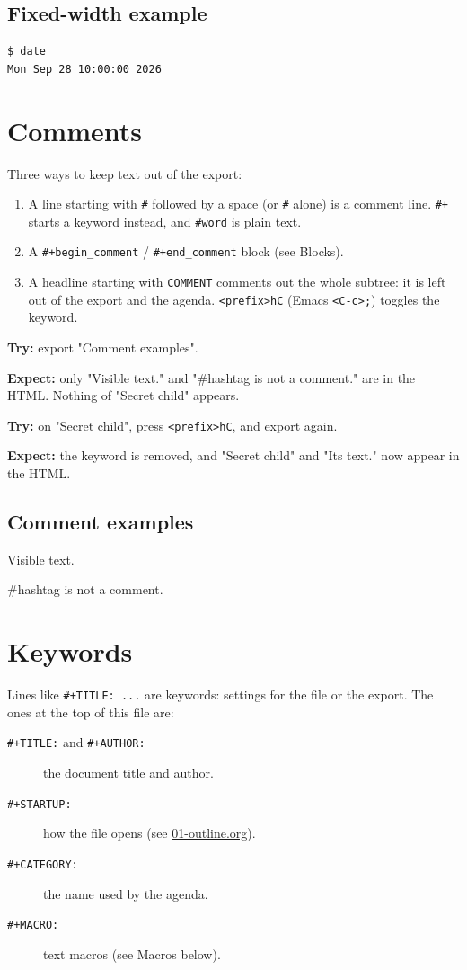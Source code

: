 \subsection{Fixed-width example}
\label{sec:orgbc77e6e}
\begin{verbatim}
$ date
Mon Sep 28 10:00:00 2026
\end{verbatim}
\section{Comments}
\label{sec:org8f24d88}
Three ways to keep text out of the export:

\begin{enumerate}
\item A line starting with \texttt{\#} followed by a space (or \texttt{\#} alone) is a
comment line. \texttt{\#+} starts a keyword instead, and \texttt{\#word} is plain text.
\item A \texttt{\#+begin\_comment} / \texttt{\#+end\_comment} block (see Blocks).
\item A headline starting with \texttt{COMMENT} comments out the whole subtree: it is
left out of the export and the agenda. \texttt{<prefix>hC} (Emacs \texttt{<C-c>;})
toggles the keyword.
\end{enumerate}

\textbf{Try:} export "Comment examples".

\textbf{Expect:} only "Visible text." and "\#hashtag is not a comment." are in the
HTML. Nothing of "Secret child" appears.

\textbf{Try:} on "Secret child", press \texttt{<prefix>hC}, and export again.

\textbf{Expect:} the keyword is removed, and "Secret child" and "Its text." now
appear in the HTML.
\subsection{Comment examples}
\label{sec:org73cb48e}
Visible text.

\#hashtag is not a comment.
\section{Keywords}
\label{sec:org1fec826}
Lines like \texttt{\#+TITLE: ...} are keywords: settings for the file or the
export. The ones at the top of this file are:

\begin{description}
\item[{\texttt{\#+TITLE:} and \texttt{\#+AUTHOR:}}] the document title and author.
\item[{\texttt{\#+STARTUP:}}] how the file opens (see
\href{01-outline.org}{01-outline.org}).
\item[{\texttt{\#+CATEGORY:}}] the name used by the agenda.
\item[{\texttt{\#+MACRO:}}] text macros (see Macros below).
\end{description}

